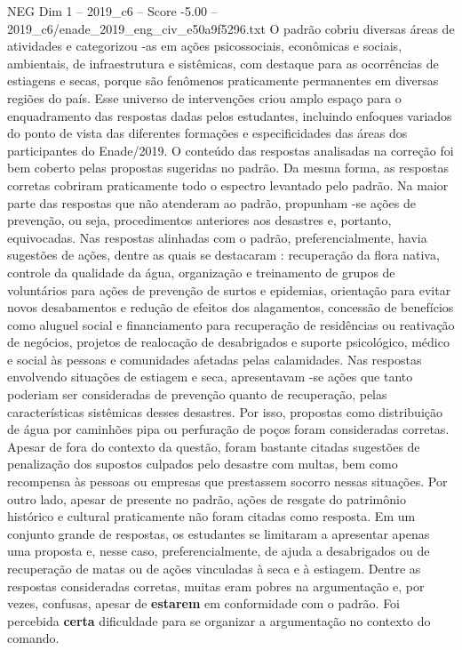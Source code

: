 \begin{textsample}{NEG Dim 1 – 2019\_c6 – Score -5.00 – 2019\_c6/enade\_2019\_eng\_civ\_e50a9f5296.txt}
O padrão cobriu diversas áreas de atividades e categorizou -as em ações psicossociais, econômicas e sociais, ambientais, de infraestrutura e sistêmicas, com destaque para as ocorrências de estiagens e secas, porque são fenômenos praticamente permanentes em diversas regiões do país.
Esse universo de intervenções criou amplo espaço para o enquadramento das respostas dadas pelos estudantes, incluindo enfoques variados do ponto de vista das diferentes formações e especificidades das áreas dos participantes do Enade/2019.
O conteúdo das respostas analisadas na correção foi bem coberto pelas propostas sugeridas no padrão.
Da mesma forma, as respostas corretas cobriram praticamente todo o espectro levantado pelo padrão.
Na maior parte das respostas que não atenderam ao padrão, propunham -se ações de prevenção, ou seja, procedimentos anteriores aos desastres e, portanto, equivocadas.
Nas respostas alinhadas com o padrão, preferencialmente, havia sugestões de ações, dentre as quais se destacaram : recuperação da flora nativa, controle da qualidade da água, organização e treinamento de grupos de voluntários para ações de prevenção de surtos e epidemias, orientação para evitar novos desabamentos e redução de efeitos dos alagamentos, concessão de benefícios como aluguel social e financiamento para recuperação de residências ou reativação de negócios, projetos de realocação de desabrigados e suporte psicológico, médico e social às pessoas e comunidades afetadas pelas calamidades.
Nas respostas envolvendo situações de estiagem e seca, apresentavam -se ações que tanto poderiam ser consideradas de prevenção quanto de recuperação, pelas características sistêmicas desses desastres.
Por isso, propostas como distribuição de água por caminhões pipa ou perfuração de poços foram consideradas corretas.
Apesar de fora do contexto da questão, foram bastante citadas sugestões de penalização dos supostos culpados pelo desastre com multas, bem como recompensa às pessoas ou empresas que prestassem socorro nessas situações.
Por outro lado, apesar de presente no padrão, ações de resgate do patrimônio histórico e cultural praticamente não foram citadas como resposta.
Em um conjunto grande de respostas, os estudantes se limitaram a apresentar apenas uma proposta e, nesse caso, preferencialmente, de ajuda a desabrigados ou de recuperação de matas ou de ações vinculadas à seca e à estiagem.
Dentre as respostas consideradas corretas, muitas eram pobres na argumentação e, por vezes, confusas, apesar de \textbf{estarem} em conformidade com o padrão.
Foi percebida \textbf{certa} dificuldade para se organizar a argumentação no contexto do comando.

\end{textsample}
